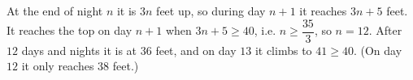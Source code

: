 At the end of night $n$ it is $3n$ feet up, so during day $n+1$ it reaches $3n+5$ feet. It reaches the top on day $n+1$ when $3n+5\ge40$, i.e. $n\ge\dfrac{35}{3}$, so $n=12$. After $12$ days and nights it is at $36$ feet, and on day $\boxed{13}$ it climbs to $41\ge40$. (On day $12$ it only reaches $38$ feet.)
